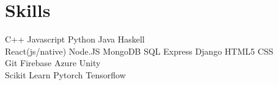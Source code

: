 \documentclass[]{deedy-resume-openfont}
\begin{document}
\begin{minipage}[t]{0.35\textwidth}








\section{Skills}
C++ \textbullet{}   Javascript \textbullet{} Python \textbullet{} Java  \textbullet{}  Haskell \\
\vspace{1 mm}
React(js/native) \textbullet{}   Node.JS  \textbullet{} MongoDB \textbullet{} SQL  \textbullet{}  Express \textbullet{}  Django \textbullet{}  HTML5 \textbullet{}  CSS\\
\vspace{1 mm}
Git \textbullet{}   Firebase \textbullet{} Azure \textbullet{} Unity  \\
\vspace{1 mm}
Scikit Learn \textbullet{} Pytorch \textbullet{} Tensorflow 


\end{minipage}
\end{document}
